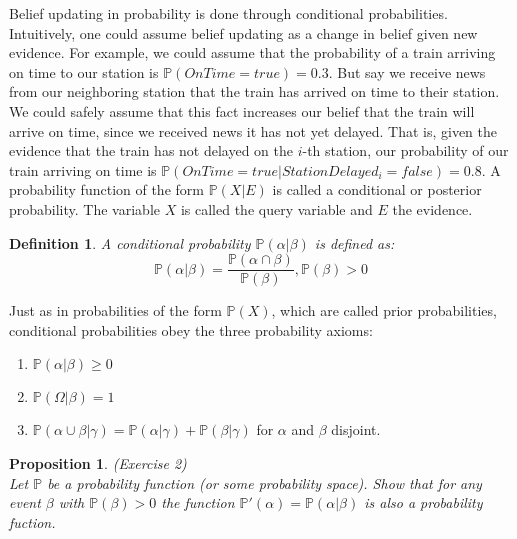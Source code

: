 \documentclass{amsart}
\theoremstyle{plain}
\newtheorem*{definition}{Definition}
\newtheorem{proposition}{Proposition}
\newcommand{\pr}{\mathbb{P}}
\begin{document}
Belief updating in probability is done through conditional probabilities. Intuitively, one could
assume belief updating as a change in belief given new evidence. For example, we could assume that
the probability of a train arriving on time to our station is $\pr(OnTime=true)=0.3$. But say we
receive news from our neighboring station that the train has arrived on time to their station. We
could safely assume that this fact increases our belief that the train will arrive on time, since
we received news it has not yet delayed. That is, given the evidence that the train has not delayed
on the $i$-th station, our probability of our train arriving on time is $\pr(OnTime=true|
StationDelayed_i=false)=0.8$. A probability function of the form $\pr(X|E)$ is called a conditional
or posterior probability. The variable $X$ is called the query variable and $E$ the evidence.

\begin{definition}
  A conditional probability $\pr(\alpha|\beta)$ is defined as:
  \begin{equation*}
    \pr(\alpha|\beta)=\frac{\pr(\alpha\cap\beta)}{\pr(\beta)}, \pr(\beta)>0
  \end{equation*}
\end{definition}

Just as in probabilities of the form $\pr(X)$, which are called prior probabilities, conditional
probabilities obey the three probability axioms:

\begin{enumerate}
  \item $\pr(\alpha|\beta)\geq0$
  \item $\pr(\Omega|\beta)=1$
  \item $\pr(\alpha\cup\beta|\gamma)=\pr(\alpha|\gamma)+\pr(\beta|\gamma)$ for $\alpha$ and $\beta$
    disjoint.
\end{enumerate}

\begin{proposition} (Exercise 2)\\
  Let $\pr$ be a probability function (or some probability space). Show that for any event $\beta$
  with $\pr(\beta)>0$ the function $\pr'(\alpha)=\pr(\alpha|\beta)$ is also a probability fuction.
\end{proposition}
\end{document}
